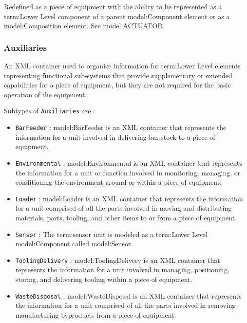 Redefined as a piece of equipment with the ability to be represented as a {term:Lower Level} component of a parent {model:Component} element or as a {model:Composition} element. See {model:ACTUATOR}

\FloatBarrier

\subsubsection{Auxiliaries}
  \label{sec:Auxiliaries}


An XML container used to organize information for {term:Lower Level} elements representing functional sub-systems that provide supplementary or extended capabilities for a piece of equipment, but they are not required for the basic operation of the equipment.

Subtypes of \texttt{Auxiliaries} are :

\begin{itemize}
\item \texttt{BarFeeder} : {model:BarFeeder} is an XML container that represents the information for a unit involved in delivering bar stock to a piece of equipment.

\item \texttt{Environmental} : {model:Environmental} is an XML container that represents the information for a unit or function involved in monitoring, managing, or conditioning the environment around or within a piece of equipment.

\item \texttt{Loader} : {model:Loader} is an XML container that represents the information for a unit comprised of all the parts involved in moving and distributing materials, parts, tooling, and other items to or from a piece of equipment.

\item \texttt{Sensor} : The {term:sensor unit} is modeled as a {term:Lower Level} {model:Component} called {model:Sensor}.

\item \texttt{ToolingDelivery} : {model:ToolingDelivery} is an XML container that represents the information for a unit involved in managing, positioning, storing, and delivering tooling within a piece of equipment.


\item \texttt{WasteDisposal} : {model:WasteDisposal} is an XML container that represents the information for a unit comprised of all the parts involved in removing manufacturing byproducts from a piece of equipment.


\end{itemize}

